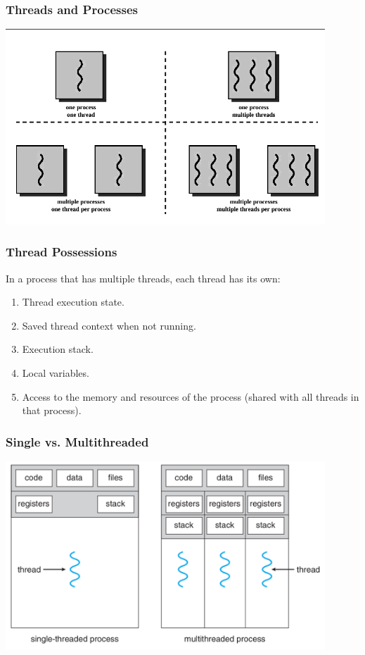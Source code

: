 \begin{frame}
\frametitle{Threads and Processes}

\begin{center}
	\includegraphics[width=0.9\textwidth]{images/mthread.png}
\end{center}

\end{frame}

\begin{frame}
\frametitle{Thread Possessions}


In a process that has multiple threads, each thread has its own:
\begin{enumerate}
	\item Thread execution state.
	\item Saved thread context when not running.
	\item Execution stack.
	\item Local variables.
	\item Access to the memory and resources of the process (shared with all threads in that process).
\end{enumerate}

\end{frame}

\begin{frame}
\frametitle{Single vs. Multithreaded}

\begin{center}
	\includegraphics[width=0.9\textwidth]{images/mthread2.png}
\end{center}

\end{frame}

